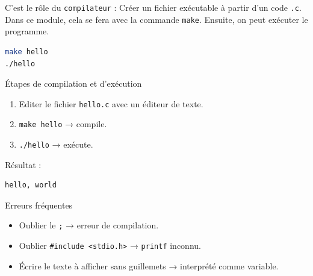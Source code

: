 C'est le rôle du \texttt{compilateur} : Créer un fichier exécutable à partir d'un code \texttt{.c}. Dans ce module, cela se fera avec la commande \texttt{make}. Ensuite, on peut exécuter le programme.
\begin{lstlisting}[language=bash,style=console]
make hello
./hello
\end{lstlisting}

\begin{UPSTIinfor}{Étapes de compilation et d'exécution}
	\begin{enumerate}
		\item Editer le fichier \texttt{hello.c} avec un éditeur de texte.
		\item \texttt{make hello} → compile.
		\item \texttt{./hello} → exécute.
	\end{enumerate}
\end{UPSTIinfor}

Résultat :
\begin{lstlisting}[language=bash,style=console]
hello, world
\end{lstlisting}

\begin{UPSTIwarning}{Erreurs fréquentes}

	\begin{itemize}
		\item Oublier le \texttt{;} → erreur de compilation.
		\item Oublier \texttt{\#include <stdio.h>} → \texttt{printf} inconnu.
		\item Écrire le texte à afficher sans guillemets → interprété comme variable.
	\end{itemize}
\end{UPSTIwarning}